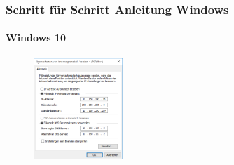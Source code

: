 \documentclass[a4paper,12pt]{scrartcl}
\begin{document}
\subsubsection*{Schritt für Schritt Anleitung Windows}

\paragraph*{Windows 10}
\begin{figure}
	\centering
	\includegraphics[width=0.3\textwidth]{Bilder/IP_Windows}
\end{figure}
\end{document}
